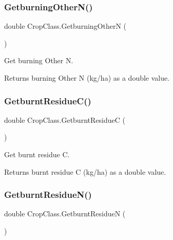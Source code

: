 \subsubsection{\texorpdfstring{GetburningOtherN()}{GetburningOtherN()}}
{\footnotesize\ttfamily double Crop\+Class.\+Getburning\+OtherN (\begin{DoxyParamCaption}{ }\end{DoxyParamCaption})\hspace{0.3cm}{\ttfamily [inline]}}



Get burning Other N. 

\begin{DoxyReturn}{Returns}
burning Other N (kg/ha) as a double value. 
\end{DoxyReturn}
\mbox{\label{class_crop_class_a973439ffcd943c40f65d766560f4eb66}} 
\subsubsection{\texorpdfstring{GetburntResidueC()}{GetburntResidueC()}}
{\footnotesize\ttfamily double Crop\+Class.\+Getburnt\+ResidueC (\begin{DoxyParamCaption}{ }\end{DoxyParamCaption})\hspace{0.3cm}{\ttfamily [inline]}}



Get burnt residue C. 

\begin{DoxyReturn}{Returns}
burnt residue C (kg/ha) as a double value. 
\end{DoxyReturn}
\mbox{\label{class_crop_class_a05c3902daff36db4fce5117ae1ccd771}} 
\subsubsection{\texorpdfstring{GetburntResidueN()}{GetburntResidueN()}}
{\footnotesize\ttfamily double Crop\+Class.\+Getburnt\+ResidueN (\begin{DoxyParamCaption}{ }\end{DoxyParamCaption})\hspace{0.3cm}{\ttfamily [inline]}}



